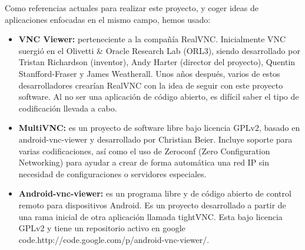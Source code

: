 Como referencias actuales para realizar este proyecto, y coger ideas de aplicaciones enfocadas en el mismo campo, hemos usado:
\begin{itemize}
\item \textbf{VNC Viewer:} perteneciente a la compañía RealVNC. Inicialmente VNC suergió en el Olivetti \& Oracle Research Lab (ORL3), siendo desarrollado por Tristan Richardson (inventor), Andy Harter (director del proyecto), Quentin Stanfford-Fraser y James Weatherall. Unos años después, varios de estos desarrolladores crearían RealVNC con la idea de seguir con este proyecto software. Al no ser una aplicación de código abierto, es difícil saber el tipo de codificación llevada a cabo.
\item \textbf{MultiVNC:} es un proyecto de software libre bajo licencia GPLv2,  basado en android-vnc-viewer y desarrollado por Christian Beier. Incluye soporte para varias codificaciones, así como el uso de Zeroconf (Zero Configuration Networking) para ayudar a crear de forma automática una red IP sin necesidad de configuraciones o servidores especiales.
\item \textbf{Android-vnc-viewer:} es un programa libre y de código abierto de control remoto para dispositivos Android. Es un proyecto desarrollado a partir de una rama inicial de otra aplicación llamada tightVNC. Esta bajo licencia GPLv2 y tiene un repositorio activo en google code.http://code.google.com/p/android-vnc-viewer/.
\end{itemize}

